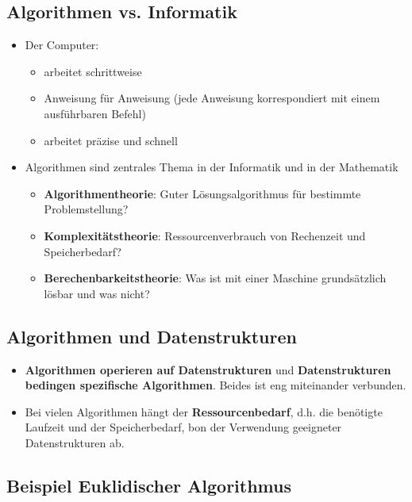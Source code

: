 \subsection{Algorithmen vs. Informatik}
\begin{itemize}[noitemsep,topsep=0pt,leftmargin=*]
    \item Der Computer:
    \begin{itemize}[noitemsep,topsep=0pt,leftmargin=*]
        \item arbeitet schrittweise
        \item Anweisung für Anweisung (jede Anweisung korrespondiert mit einem ausführbaren Befehl)
        \item arbeitet präzise und schnell
    \end{itemize}
    \item Algorithmen sind zentrales Thema in der Informatik und in der Mathematik
    \begin{itemize}[noitemsep,topsep=0pt,leftmargin=*]
        \item \textbf{Algorithmentheorie}: Guter Lösungsalgorithmus für bestimmte Problemstellung?
        \item \textbf{Komplexitätstheorie}: Ressourcenverbrauch von Rechenzeit und Speicherbedarf?
        \item \textbf{Berechenbarkeitstheorie}: Was ist mit einer Maschine grundsätzlich lösbar und was nicht?
    \end{itemize}
\end{itemize}

\subsection{Algorithmen und Datenstrukturen}
\begin{itemize}[noitemsep,topsep=0pt,leftmargin=*]
    \item \textbf{Algorithmen operieren auf Datenstrukturen} und \textbf{Datenstrukturen bedingen spezifische Algorithmen}. Beides ist eng miteinander verbunden.
    \item Bei vielen Algorithmen hängt der \textbf{Ressourcenbedarf}, d.h. die benötigte Laufzeit und der Speicherbedarf, bon der Verwendung geeigneter Datenstrukturen ab.
\end{itemize}

\subsection{Beispiel Euklidischer Algorithmus}
